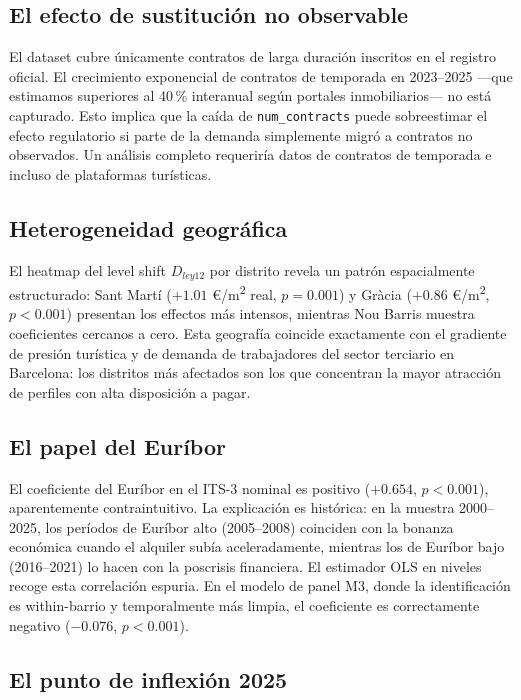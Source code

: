 \documentclass[12pt,a4paper]{article}
\begin{document}
\subsection{El efecto de sustitución no observable}

El dataset cubre únicamente contratos de larga duración inscritos en el registro
oficial. El crecimiento exponencial de contratos de temporada en 2023--2025 ---que
estimamos superiores al 40\,\% interanual según portales inmobiliarios--- no está
capturado. Esto implica que la caída de \texttt{num\_contracts} puede sobreestimar
el efecto regulatorio si parte de la demanda simplemente migró a contratos no
observados. Un análisis completo requeriría datos de contratos de temporada e incluso
de plataformas turísticas.

\subsection{Heterogeneidad geográfica}

El heatmap del level shift $D_{ley12}$ por distrito revela un patrón espacialmente
estructurado: Sant Martí ($+1.01$ \euro/m\textsuperscript{2} real, $p=0.001$) y
Gràcia ($+0.86$ \euro/m\textsuperscript{2}, $p<0.001$) presentan los effectos más
intensos, mientras Nou Barris muestra coeficientes cercanos a cero. Esta geografía
coincide exactamente con el gradiente de presión turística y de demanda de trabajadores
del sector terciario en Barcelona: los distritos más afectados son los que concentran
la mayor atracción de perfiles con alta disposición a pagar.

\subsection{El papel del Euríbor}

El coeficiente del Euríbor en el ITS-3 nominal es positivo ($+0.654$, $p<0.001$),
aparentemente contraintuitivo. La explicación es histórica: en la muestra 2000--2025,
los períodos de Euríbor alto (2005--2008) coinciden con la bonanza económica cuando
el alquiler subía aceleradamente, mientras los de Euríbor bajo (2016--2021) lo hacen
con la poscrisis financiera. El estimador OLS en niveles recoge esta correlación espuria.
En el modelo de panel M3, donde la identificación es within-barrio y temporalmente
más limpia, el coeficiente es correctamente negativo ($-0.076$, $p<0.001$).

\subsection{El punto de inflexión 2025}
\end{document}
